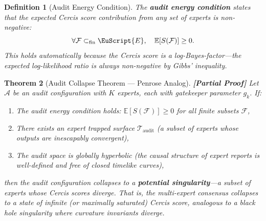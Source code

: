 \documentclass[12pt,a4paper]{article}
\newtheorem{theorem}{Theorem}[section]
\newtheorem{definition}[theorem]{Definition}
\theoremstyle{remark}
\newcommand{\E}{\mathbb{E}}
\newcommand{\F}{\mathcal{F}}
\newcommand{\ExpertSet}{\EuScript{E}}
\newcommand{\Cercis}{\textsf{Cercis}}
\newcommand{\rigorPartial}{\textbf{[Partial Proof]}}
\begin{document}
\begin{definition}[Audit Energy Condition]
\label{def:audit_energy}
The \textbf{audit energy condition} states that the expected \Cercis{} score contribution from any set of experts is non-negative:
\begin{equation}
  \forall \F \subset_{\text{fin}} \ExpertSet,\quad \E[S(\F)] \geq 0.
\end{equation}
This holds automatically because the \Cercis{} score is a log-Bayes-factor---the expected log-likelihood ratio is always non-negative by Gibbs' inequality.
\end{definition}

\begin{theorem}[Audit Collapse Theorem — Penrose Analog]
\label{thm:audit_collapse}
\rigorPartial
Let $\mathcal{A}$ be an audit configuration with $K$ experts, each with gatekeeper parameter $g_k$. If:
\begin{enumerate}[leftmargin=*, label=(\roman*)]
  \item The audit energy condition holds: $\E[S(\F)] \geq 0$ for all finite subsets $\F$,
  \item There exists an expert trapped surface $\mathcal{T}_{\text{audit}}$ (a subset of experts whose outputs are inescapably convergent),
  \item The audit space is globally hyperbolic (the causal structure of expert reports is well-defined and free of closed timelike curves),
\end{enumerate}
then the audit configuration collapses to a \textbf{potential singularity}---a subset of experts whose \Cercis{} scores diverge. That is, the multi-expert consensus collapses to a state of infinite (or maximally saturated) \Cercis{} score, analogous to a black hole singularity where curvature invariants diverge.
\end{theorem}
\end{document}
